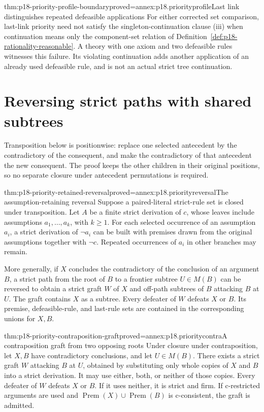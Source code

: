 \begin{hbtheorem}{thm:p18-priority-profile-boundary}{proved=annex:p18.priorityprofile}{Last link distinguishes repeated defeasible applications}
For either corrected set comparison, last-link priority need not satisfy
the singleton-continuation clause (iii) when continuation means only
the component-set relation of
Definition~\ref{def:p18-rationality-reasonable}.
A theory with one axiom and two defeasible rules witnesses this failure.
Its violating continuation adds another application of an already used
defeasible rule, and is not an actual strict tree continuation.
\end{hbtheorem}

\section{Reversing strict paths with shared subtrees}

Transposition below is positionwise: replace one selected antecedent by
the contradictory of the consequent, and make the contradictory of that
antecedent the new consequent. The proof keeps the other children in their
original positions, so no separate closure under antecedent permutations
is required.

\begin{hbtheorem}{thm:p18-priority-retained-reversal}{proved=annex:p18.priorityreversal}{The assumption-retaining reversal}
Suppose a paired-literal strict-rule set is closed under transposition.
Let \(A\) be a finite strict derivation of \(c\), whose leaves include
assumptions \(a_1,\ldots,a_k\), with \(k\geq1\).
For each selected occurrence of an assumption \(a_i\), a strict derivation
of \(\neg a_i\) can be built with premises drawn from the original
assumptions together with \(\neg c\). Repeated occurrences of \(a_i\)
in other branches may remain.

More generally, if \(X\) concludes the contradictory of the conclusion
of an argument \(B\), a strict path from the root of \(B\) to a
frontier subtree \(U\in M(B)\) can be reversed to obtain a strict graft
\(W\) of \(X\) and off-path subtrees of \(B\) attacking \(B\) at \(U\).
The graft contains \(X\) as a subtree. Every defeater of \(W\) defeats
\(X\) or \(B\). Its premise, defeasible-rule, and last-rule sets are
contained in the corresponding unions for \(X,B\).
\end{hbtheorem}

\begin{hblemma}{thm:p18-priority-contraposition-graft}{proved=annex:p18.prioritycontra}{A contraposition graft from two opposing roots}
Under closure under contraposition, let \(X,B\) have contradictory
conclusions, and let \(U\in M(B)\).
There exists a strict graft \(W\) attacking \(B\) at \(U\), obtained
by substituting only whole copies of \(X\) and \(B\) into a strict
derivation. It may use either, both, or neither of those copies.
Every defeater of \(W\) defeats \(X\) or \(B\).
If it uses neither, it is strict and firm.
If c-restricted arguments are used and
\(\operatorname{Prem}(X)\cup\operatorname{Prem}(B)\) is c-consistent,
the graft is admitted.
\end{hblemma}

